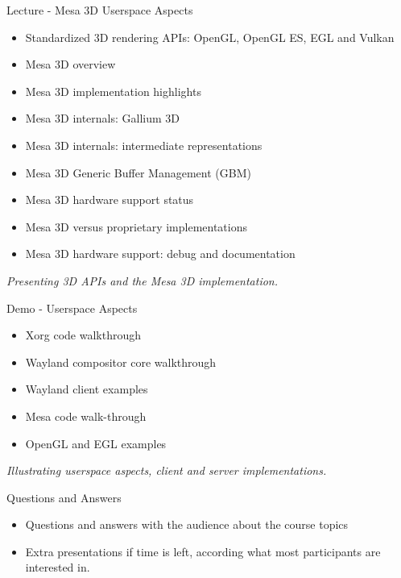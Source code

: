 \documentclass[a4paper,12pt,obeyspaces,spaces,hyphens]{article}
\begin{document}
\feagendatwocolumn
{Lecture - Mesa 3D Userspace Aspects}
{
  \begin{itemize}
  \item Standardized 3D rendering APIs: OpenGL, OpenGL ES, EGL and Vulkan
  \item Mesa 3D overview
  \item Mesa 3D implementation highlights
  \item Mesa 3D internals: Gallium 3D
  \item Mesa 3D internals: intermediate representations
  \item Mesa 3D Generic Buffer Management (GBM)
  \item Mesa 3D hardware support status
  \item Mesa 3D versus proprietary implementations
  \item Mesa 3D hardware support: debug and documentation
  \end{itemize}
  \vspace{0.5em}
  {\em Presenting 3D APIs and the Mesa 3D implementation.}
}
{Demo - Userspace Aspects}
{
  \begin{itemize}
  \item Xorg code walkthrough
  \item Wayland compositor core walkthrough
  \item Wayland client examples
  \item Mesa code walk-through
  \item OpenGL and EGL examples
  \end{itemize}
  \vspace{0.5em}
  {\em Illustrating userspace aspects, client and server implementations.}
}

\feagendaonecolumn
{Questions and Answers}
{
  \begin{itemize}
  \item Questions and answers with the audience about the course topics
  \item Extra presentations if time is left, according what most
        participants are interested in.
  \end{itemize}
}
\end{document}
